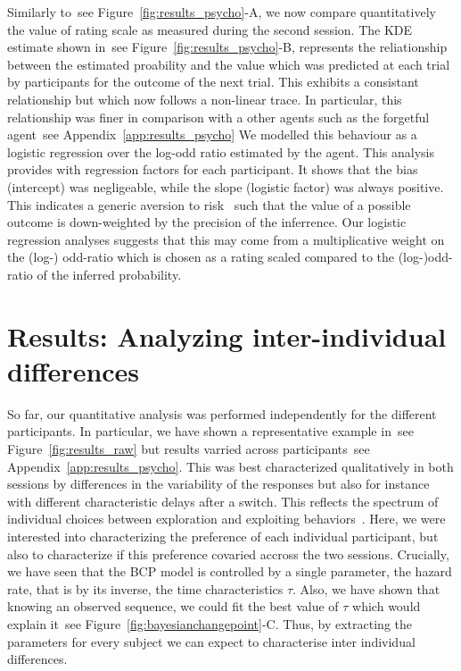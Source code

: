\documentclass[profile,final,english, draft]{article}%
\newcommand{\citep}[1]{\parencite{#1}}
\newcommand{\seeFig}[1]{see Figure~\ref{fig:#1}}
\newcommand{\seeApp}[1]{see Appendix~\ref{app:#1}}
\begin{document}
Similarly to~\seeFig{results_psycho}-A,
we now compare quantitatively the value of rating scale
as measured during the second session.
The KDE estimate shown in~\seeFig{results_psycho}-B,
represents the reliationship between
the estimated proability
and the value which was predicted at each trial
by participants for the outcome of the next trial.
This exhibits a consistant relationship
but which now follows a non-linear trace.
In particular, this relationship was finer
in comparison with a other agents
such as the forgetful agent~\seeApp{results_psycho}
We modelled this behaviour as
a logistic regression over
the log-odd ratio estimated by the agent.
This analysis provides with regression factors for each participant.
It shows that the bias (intercept)
was negligeable, while the slope (logistic factor)
was always positive.
This indicates a generic aversion to risk~\citep{KanehmanXX}
such that the value of a possible outcome
is down-weighted by the precision of the inferrence.
Our logistic regression analyses
suggests that this may come from a multiplicative weight
on the (log-) odd-ratio which is chosen as a rating scaled
compared to the (log-)odd-ratio of the inferred probability.

\section{Results: Analyzing inter-individual differences}
\label{sec:inter}
So far, our quantitative analysis was performed independently
for the different participants.
In particular, we have shown a representative example in~\seeFig{results_raw}
but results varried across participants~\seeApp{results_psycho}.
This was best characterized qualitatively in both sessions by differences
in the variability of the responses but also for instance
with different characteristic delays after a switch.
This reflects the spectrum of individual choices
between exploration and exploiting behaviors~\citep{Behrens?}.
Here, we were interested into characterizing the preference
of each individual participant, but also to characterize
if this preference covaried accross the two sessions.
Crucially, we have seen that the BCP model is controlled by a single parameter,
the hazard rate, that is by its inverse, the time characteristics $\tau$.
Also, we have shown that knowing an observed sequence,
we could fit the best value of $\tau$ which would explain it~\seeFig{bayesianchangepoint}-C.
Thus, by extracting the parameters for every subject
we can expect to characterise inter individual differences.
\end{document}
